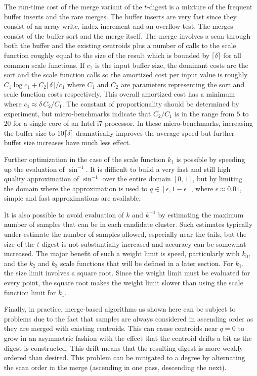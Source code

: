 \documentclass[11pt]{amsart}
\begin{document}
The run-time cost of the merge variant of the $t$-digest is a mixture of the frequent buffer inserts  and the rare  merges. The buffer inserts are very fast since they consist of an array write, index increment and an overflow test. The merges consist of the buffer sort and the merge itself. The merge involves a scan through both the buffer and the existing centroids plus a number of calls to the scale function roughly equal to the size of the result which is bounded by $ \lceil \delta \rceil$ for all common scale functions. If $c_1$ is the input buffer size, the dominant costs are the sort and the scale function calls so the amortized cost per input value is roughly $C_1 \log c_1 + C_2 \lceil \delta \rceil / c_1$ where $C_1$ and $C_2$ are parameters representing the sort and scale function costs respectively. This overall amortized cost has a minimum where $c_1 \approx \delta\, C_2  / C_1$. The constant of proportionality should be determined by experiment, but micro-benchmarks indicate that $C_2 / C_1$ is in the range from $5$ to $20$ for a single core of an Intel i7 processor. In these micro-benchmarks, increasing the buffer size to $10 \lceil \delta \rceil$ dramatically improves the average speed but further buffer size increases have much less effect. 

Further optimization in the case of the scale function $k_1$ is possible by speeding up the evaluation of $\sin^{-1}$. It is difficult to build a very fast and still high quality approximation of $\sin^{-1}$ over the entire domain $[0,1]$, but by limiting the domain where the approximation is used to $q \in [\epsilon, 1-\epsilon]$, where $\epsilon \approx 0.01$, simple and fast approximations are available.

It is also possible to avoid evaluation of $k$ and $k^{-1}$ by estimating the maximum number of samples that can be in each candidate cluster. Such estimates typically under-estimate the number of samples allowed, especially near the tails, but the size of the $t$-digest is not substantially increased and accuracy can be somewhat increased. The major benefit of such a weight limit is speed, particularly with $k_0$, and the $k_2$ and $k_3$ scale functions that will be defined in a later section. For $k_1$, the size limit involves a square root. Since the weight limit must be evaluated for every point, the square root makes the weight limit slower than using the scale function limit for $k_1$. 

Finally, in practice, merge-based algorithms as shown here can be subject to problems due to the fact that samples are always considered in ascending order as they are merged with existing centroids. This can cause centroids near $q=0$ to grow in an asymmetric fashion with the effect that the centroid drifts a bit as the digest is constructed. This drift means that the resulting digest is more weakly ordered than desired. This problem can be mitigated to a degree by alternating the scan order in the merge (ascending in one pass, descending the next). 
\end{document}
